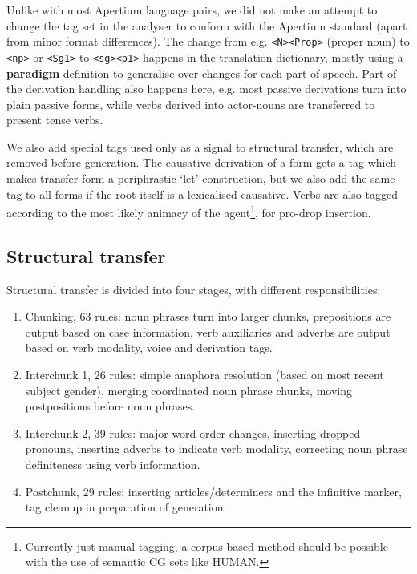 \documentclass{book}
\begin{document}
Unlike with most Apertium language pairs, we did not make an attempt
to change the tag set in the analyser to conform with the Apertium
standard (apart from minor format differences). The change from e.g.
\texttt{<N><Prop>} (proper noun) to \texttt{<np>} or \texttt{<Sg1>} to
\texttt{<sg><p1>} happens in the translation dictionary, mostly using a
\textbf{paradigm} definition to generalise over changes for each part
of speech. Part of the derivation handling also happens here, e.g. 
most passive derivations turn into plain passive forms, while verbs
derived into actor-nouns are transferred to present tense verbs.

We also add special tags used only as a signal to structural transfer,
which are removed before generation. The causative derivation of a
form gets a tag which makes transfer form a periphrastic
`let'-construction, but we also add the same tag to all forms if the
root itself is a lexicalised causative. Verbs are also tagged
according to the most likely animacy of the agent\footnote{Currently
  just manual tagging, a corpus-based method should be possible with
  the use of semantic CG sets like HUMAN.}, for pro-drop insertion.

\subsection{Structural transfer}
\label{sec:structural-transfer}
Structural transfer is divided into four stages, with different
responsibilities:

\begin{enumerate}

\item Chunking, 63 rules: noun phrases turn into larger chunks,
  prepositions are output based on case information, verb auxiliaries
  and adverbs are output based on verb modality, voice and derivation
  tags.

\item Interchunk 1, 26 rules: simple anaphora resolution (based on
  most recent subject gender), merging coordinated noun phrase chunks,
  moving postpositions before noun phrases.

\item Interchunk 2, 39 rules: major word order changes, inserting
  dropped pronouns, inserting adverbs to indicate verb modality,
  correcting noun phrase definiteness using verb information.

\item Postchunk, 29 rules: inserting articles/determiners and the
  infinitive marker, tag cleanup in preparation of generation.
\end{enumerate}
\end{document}
